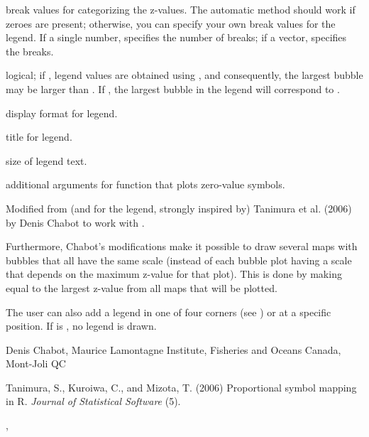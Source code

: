 \documentclass[letterpaper]{book}
\begin{document}
\begin{Arguments}
\begin{ldescription}
\item[\code{legend.breaks}] break values for categorizing the z-values.
The automatic method should work if zeroes are present;
otherwise, you can specify your own break values for the legend.
If a single number, specifies the number of breaks; if a vector,
specifies the breaks.
\item[\code{show.actual}] logical; if , legend values are
obtained using , and consequently, the largest
bubble may be larger than .  If , the largest
bubble in the legend will correspond to .
\item[\code{legend.type}] display format for legend.
\item[\code{legend.title}] title for legend.
\item[\code{legend.cex}] size of legend text.
\item[\code{...}] additional arguments for  function that
plots zero-value symbols.
\end{ldescription}
\end{Arguments}
%
\begin{Details}\relax
Modified from (and for the legend, strongly inspired by) Tanimura
et al. (2006) by Denis Chabot to work with .

Furthermore, Chabot's modifications make it possible to draw
several maps with bubbles that all have the same scale
(instead of each bubble plot having a scale that depends on
the maximum z-value for that plot). This is done by making
 equal to the largest z-value from all maps that will be
plotted.

The user can also add a legend in one of four corners
(see ) or at a specific  position.
If  is , no legend is drawn.
\end{Details}
%
\begin{Author}\relax
Denis Chabot, Maurice Lamontagne Institute, Fisheries and Oceans Canada, Mont-Joli QC
\end{Author}
%
\begin{References}\relax
Tanimura, S., Kuroiwa, C., and Mizota, T. (2006)
Proportional symbol mapping in R.
\emph{Journal of Statistical Software} (5).
\end{References}
%
\begin{SeeAlso}\relax
{}, 
\end{SeeAlso}
\end{document}
